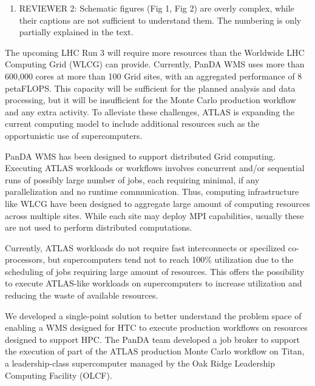 \begin{enumerate}
\begin{itemize}
		(§IIIB). WLCG has a significant number of sites providing 16 or more
		cores per worker node [REBUSCPU].
		https://wlcg-rebus.cern.ch/apps/capacities/federations/
	\end{itemize}
	\item REVIEWER 2: Schematic figures (Fig 1, Fig 2) are overly complex,
	while their captions are not sufficient to understand them. The numbering
	is only partially explained in the text.
\end{enumerate}
\fi

The upcoming LHC Run 3 will require more resources than the Worldwide LHC
Computing Grid (WLCG) can provide. Currently, PanDA WMS uses more than
600,000 cores at more than 100 Grid sites, with an aggregated performance of
8 petaFLOPS\@. This capacity will be sufficient for the planned analysis
and data processing, but it will be insufficient for the Monte Carlo
production workflow and any extra activity. To alleviate these challenges,
ATLAS is expanding the current computing model to include additional
resources such as the opportunistic use of supercomputers.

PanDA WMS has been designed to support distributed Grid computing. Executing
ATLAS workloads or workflows involves concurrent and/or sequential runs of
possibly large number of jobs, each requiring minimal, if any parallelization
and no runtime communication. Thus, computing infrastructure like WLCG have
been designed to aggregate large amount of computing resources across
multiple sites. While each site may deploy MPI capabilities, usually these
are not used to perform distributed computations.

Currently, ATLAS workloads do not require fast interconnects or specilized
co-processors, but supercomputers tend not to reach 100\% utilization due to
the scheduling of jobs requiring large amount of resources. This offers the
possibility to execute ATLAS-like workloads on supercomputers to increase
utilization and reducing the waste of available resources.

We developed a single-point solution to better understand the problem space
of enabling a WMS designed for HTC to execute production workflows on
resources designed to support HPC\@. The PanDA team developed a job broker to
support the execution of part of the ATLAS production Monte Carlo workflow on
Titan, a leadership-class supercomputer managed by the Oak Ridge Leadership
Computing Facility (OLCF).

